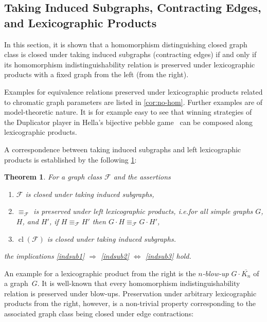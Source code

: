 \documentclass[3p,final]{elsarticle}
\DeclareMathOperator{\cl}{cl}
\newtheorem{theorem}{Theorem}
\begin{document}
	\subsection{Taking Induced Subgraphs, Contracting Edges, and Lexicographic Products}
	
	In this section, it is shown that a homomorphism distinguishing closed graph class is closed under taking induced subgraphs (contracting edges) if and only if its homomorphism indistinguishability relation is preserved under lexicographic products with a fixed graph from the left (from the right).
	
	Examples for equivalence relations preserved under lexicographic products related to chromatic graph parameters are listed in \cref{cor:no-hom}. 
	Further examples are of model-theoretic nature.
	It is for example easy to see that winning strategies of the Duplicator player in Hella's bijective pebble game~\cite{hella_logical_1996} can be composed along lexicographic products.
	
	A correspondence between taking induced subgraphs and left lexicographic products is established by the following \cref{prop:lexprod-indsub}:
	
	\begin{theorem} \label{prop:lexprod-indsub}
		For a graph class $\mathcal{F}$ and the assertions
		\begin{enumerate}
			\item $\mathcal{F}$ is closed under taking induced subgraphs,\label{indsub1}
			\item $\equiv_{\mathcal{F}}$ is \emph{preserved under left lexicographic products}, i.e.\@ for all simple graphs $G$, $H$, and $H'$, if $H \equiv_{\mathcal{F}} H'$ then $G \cdot H \equiv_{\mathcal{F}} G \cdot H'$,\label{indsub2}
			\item $\cl(\mathcal{F})$ is closed under taking induced subgraphs.\label{indsub3}
		\end{enumerate}
		the implications \ref{indsub1} $\Rightarrow$ \ref{indsub2} $\Leftrightarrow$ \ref{indsub3} hold.
	\end{theorem}
	

	An example for a lexicographic product from the right is the \emph{$n$-blow-up} $G \cdot \overline{K_n}$ of a graph~$G$.
	It is well-known \cite{lovasz_large_2012} that every homomorphism indistinguishability relation is preserved under blow-ups. 
	Preservation under arbitrary lexicographic products from the right, however, is a non-trivial property corresponding to the associated graph class being closed under edge contractions:
\end{document}
